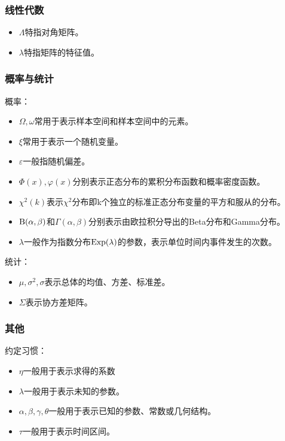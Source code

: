 \subsubsection{线性代数}

\begin{itemize}
\item $\Lambda$特指对角矩阵。
\item $\lambda$特指矩阵的特征值。
\end{itemize}

\subsubsection{概率与统计}

概率：
\begin{itemize}
\item $\Omega,\omega$常用于表示样本空间和样本空间中的元素。
\item $\xi$常用于表示一个随机变量。
\item $\varepsilon$一般指随机偏差。
\item $\Phi(x),\varphi(x)$分别表示正态分布的累积分布函数和概率密度函数。
\item $\chi^2(k)$表示$\chi^2$分布即k个独立的标准正态分布变量的平方和服从的分布。
\item ${\rm B(\alpha,\beta)}$和$\Gamma (\alpha,\beta)$分别表示由欧拉积分导出的Beta分布和Gamma分布。
\item $\lambda$一般作为指数分布${\rm Exp}(\lambda)$的参数，表示单位时间内事件发生的次数。
\end{itemize}

统计：
\begin{itemize}
\item $\mu,\sigma^2,\sigma$表示总体的均值、方差、标准差。
\item $\Sigma$表示协方差矩阵。
\end{itemize}


\subsubsection{其他}

约定习惯：

\begin{itemize}
\item $\eta$一般用于表示求得的系数
\item $\lambda$一般用于表示未知的参数。
\item $\alpha,\beta,\gamma,\theta$一般用于表示已知的参数、常数或几何结构。
\item $\tau$一般用于表示时间区间。
\end{itemize}

